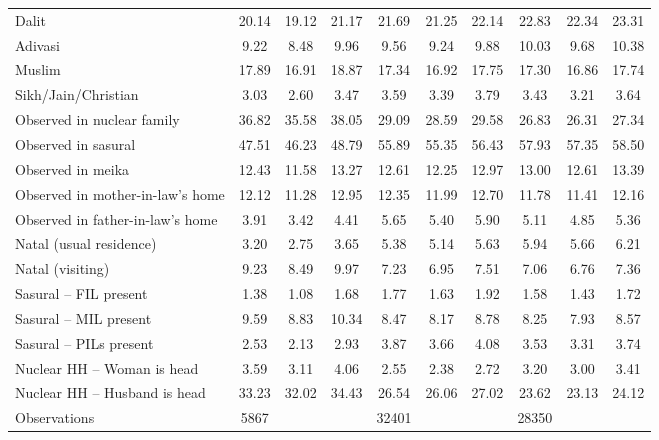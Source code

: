 {\begin{tabular}{l*{3}{ccc}}
Dalit               &       20.14&       19.12&       21.17&       21.69&       21.25&       22.14&       22.83&       22.34&       23.31\\
Adivasi             &        9.22&        8.48&        9.96&        9.56&        9.24&        9.88&       10.03&        9.68&       10.38\\
Muslim              &       17.89&       16.91&       18.87&       17.34&       16.92&       17.75&       17.30&       16.86&       17.74\\
Sikh/Jain/Christian &        3.03&        2.60&        3.47&        3.59&        3.39&        3.79&        3.43&        3.21&        3.64\\
Observed in nuclear family&       36.82&       35.58&       38.05&       29.09&       28.59&       29.58&       26.83&       26.31&       27.34\\
Observed in sasural &       47.51&       46.23&       48.79&       55.89&       55.35&       56.43&       57.93&       57.35&       58.50\\
Observed in meika   &       12.43&       11.58&       13.27&       12.61&       12.25&       12.97&       13.00&       12.61&       13.39\\
Observed in mother-in-law's home&       12.12&       11.28&       12.95&       12.35&       11.99&       12.70&       11.78&       11.41&       12.16\\
Observed in father-in-law's home&        3.91&        3.42&        4.41&        5.65&        5.40&        5.90&        5.11&        4.85&        5.36\\
Natal (usual residence)&        3.20&        2.75&        3.65&        5.38&        5.14&        5.63&        5.94&        5.66&        6.21\\
Natal (visiting)    &        9.23&        8.49&        9.97&        7.23&        6.95&        7.51&        7.06&        6.76&        7.36\\
Sasural – FIL present&        1.38&        1.08&        1.68&        1.77&        1.63&        1.92&        1.58&        1.43&        1.72\\
Sasural – MIL present&        9.59&        8.83&       10.34&        8.47&        8.17&        8.78&        8.25&        7.93&        8.57\\
Sasural – PILs present&        2.53&        2.13&        2.93&        3.87&        3.66&        4.08&        3.53&        3.31&        3.74\\
Nuclear HH – Woman is head&        3.59&        3.11&        4.06&        2.55&        2.38&        2.72&        3.20&        3.00&        3.41\\
Nuclear HH – Husband is head&       33.23&       32.02&       34.43&       26.54&       26.06&       27.02&       23.62&       23.13&       24.12\\
\hline
Observations        &        5867&            &            &       32401&            &            &       28350&            &            \\
\hline\hline
\end{tabular}
}
